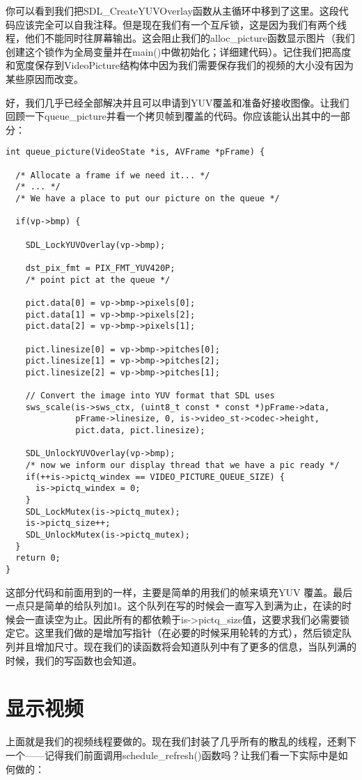 你可以看到我们把SDL_CreateYUVOverlay函数从主循环中移到了这里。这段代码应该完全可以自我注释。但是现在我们有一个互斥锁，这是因为我们有两个线程，他们不能同时往屏幕输出。这会阻止我们的alloc_picture函数显示图片（我们创建这个锁作为全局变量并在main()中做初始化；详细建代码）。记住我们把高度和宽度保存到VideoPicture结构体中因为我们需要保存我们的视频的大小没有因为某些原因而改变。

好，我们几乎已经全部解决并且可以申请到YUV覆盖和准备好接收图像。让我们回顾一下queue_picture并看一个拷贝帧到覆盖的代码。你应该能认出其中的一部分：
\begin{lstlisting}
int queue_picture(VideoState *is, AVFrame *pFrame) {

  /* Allocate a frame if we need it... */
  /* ... */
  /* We have a place to put our picture on the queue */

  if(vp->bmp) {

    SDL_LockYUVOverlay(vp->bmp);

    dst_pix_fmt = PIX_FMT_YUV420P;
    /* point pict at the queue */

    pict.data[0] = vp->bmp->pixels[0];
    pict.data[1] = vp->bmp->pixels[2];
    pict.data[2] = vp->bmp->pixels[1];

    pict.linesize[0] = vp->bmp->pitches[0];
    pict.linesize[1] = vp->bmp->pitches[2];
    pict.linesize[2] = vp->bmp->pitches[1];

    // Convert the image into YUV format that SDL uses
    sws_scale(is->sws_ctx, (uint8_t const * const *)pFrame->data,
	          pFrame->linesize, 0, is->video_st->codec->height,
			  pict.data, pict.linesize);

    SDL_UnlockYUVOverlay(vp->bmp);
    /* now we inform our display thread that we have a pic ready */
    if(++is->pictq_windex == VIDEO_PICTURE_QUEUE_SIZE) {
      is->pictq_windex = 0;
    }
    SDL_LockMutex(is->pictq_mutex);
    is->pictq_size++;
    SDL_UnlockMutex(is->pictq_mutex);
  }
  return 0;
}
\end{lstlisting}


这部分代码和前面用到的一样，主要是简单的用我们的帧来填充YUV 覆盖。最后一点只是简单的给队列加1。这个队列在写的时候会一直写入到满为止，在读的时候会一直读空为止。因此所有的都依赖于is->pictq_size值，这要求我们必需要锁定它。这里我们做的是增加写指针（在必要的时候采用轮转的方式），然后锁定队列并且增加尺寸。现在我们的读函数将会知道队列中有了更多的信息，当队列满的时候，我们的写函数也会知道。

\section{显示视频}
上面就是我们的视频线程要做的。现在我们封装了几乎所有的散乱的线程，还剩下一个——记得我们前面调用schedule_refresh()函数吗？让我们看一下实际中是如何做的：

